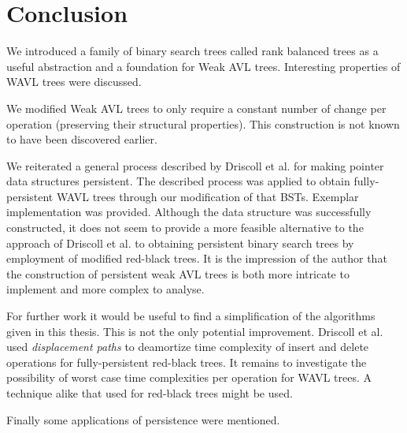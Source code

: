 \chapter*{Conclusion}

We introduced a family of binary search trees called rank balanced trees as a useful abstraction and a foundation for Weak AVL trees. Interesting properties of WAVL trees were discussed.

We modified Weak AVL trees to only require a constant number of change per operation (preserving their structural properties). This construction is not known to have been discovered earlier.

We reiterated a general process described by Driscoll et al.\cite{persistence-DSST} for making pointer data structures persistent. 
The described process was applied to obtain fully-persistent WAVL trees through our modification of that BSTs. 
Exemplar implementation was provided. Although the data structure was successfully constructed, 
it does not seem to provide a more feasible alternative to the approach of Driscoll et al. to obtaining persistent binary search trees by employment of modified red-black trees. 
It is the impression of the author that the construction of persistent weak AVL trees is both more intricate to implement and more complex to analyse.

For further work it would be useful to find a simplification of the algorithms given in this thesis. This is not the only potential improvement.
Driscoll et al. used \textit{displacement paths} to deamortize time complexity of insert and delete operations for fully-persistent red-black trees. 
It remains to investigate the possibility of worst case time complexities per operation for WAVL trees. A technique alike that used for red-black trees might be used.


Finally some applications of persistence were mentioned.
